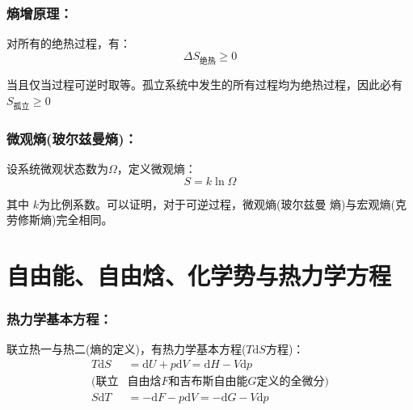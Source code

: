 \documentclass[zihao=5,UTF8]{report}
\begin{document}
\subsubsection{熵增原理：}
对所有的绝热过程，有：
\begin{equation}
    \Delta S_{\text{绝热}} \ge  0
\end{equation}
{\par\color{gray}\small
当且仅当过程可逆时取等。孤立系统中发生的所有过程均为绝热过程，因此必有$S_{\text{孤立}} \ge 0$
\par}

\subsubsection{微观熵(玻尔兹曼熵)：}
设系统微观状态数为$\Omega$，定义微观熵：
\begin{equation}
    S = k\ln \Omega
\end{equation}
{\par\color{gray}\small
其中 $k$为比例系数。可以证明，对于可逆过程，微观熵(玻尔兹曼 熵)与宏观熵(克劳修斯熵)完全相同。
\par}

\section{自由能、自由焓、化学势与热力学方程}

\subsubsection{热力学基本方程：}
联立热一与热二(熵的定义)，有热力学基本方程($T\mathrm{d}S$方程)：
\begin{align*}
    T\mathrm{d}S &= \mathrm{d}U +p\mathrm{d}V  
    = \mathrm{d}H - V\mathrm{d}p \\
    (\text{联立}&\text{自由焓$F$和吉布斯自由能$G$定义的全微分})\\
    S\mathrm{d}T& = -\mathrm{d}F - p\mathrm{d}V = -\mathrm{d}G - V\mathrm{d}p 
\end{align*}
\end{document}
